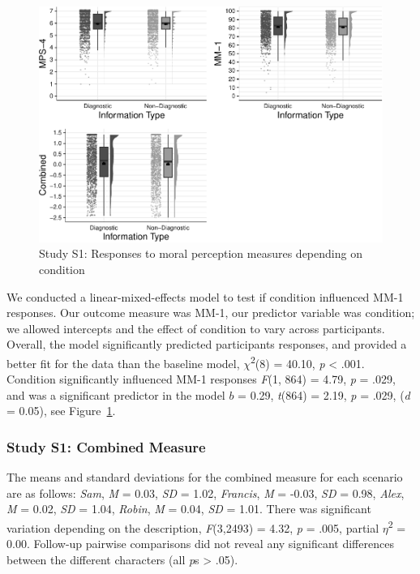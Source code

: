 \documentclass[
  man,floatsintext]{apa6}
\begin{document}
\begin{figure}[!h]
\includegraphics[width=\textwidth,]{Supplementary_files/figure-latex/S4bothconditionplot-1} \caption{Study S1: Responses to moral perception measures depending on condition}\label{fig:S4bothconditionplot}
\end{figure}

We conducted a linear-mixed-effects model to test if condition influenced MM-1 responses. Our outcome measure was MM-1, our predictor variable was condition; we allowed intercepts and the effect of condition to vary across participants. Overall, the model significantly predicted participants responses, and provided a better fit for the data than the baseline model, \(\chi\)\textsuperscript{2}(8) = 40.10, \emph{p} \textless{} .001. Condition significantly influenced MM-1 responses \emph{F}(1, 864) = 4.79, \emph{p} = .029, and was a significant predictor in the model \(b\) = 0.29, \emph{t}(864) = 2.19, \emph{p} = .029, (\emph{d} = 0.05), see Figure~\ref{fig:S4bothconditionplot}.

\subsubsection{Study S1: Combined Measure}\label{study-s1-combined-measure}

The means and standard deviations for the combined measure for each scenario are as follows:
\emph{Sam},
\emph{M} = 0.03, \emph{SD} = 1.02,
\emph{Francis},
\emph{M} = -0.03, \emph{SD} = 0.98,
\emph{Alex},
\emph{M} = 0.02, \emph{SD} = 1.04,
\emph{Robin},
\emph{M} = 0.04, \emph{SD} = 1.01. There was significant variation depending on the description, \emph{F}(3,2493) = 4.32, \emph{p} = .005, partial \(\eta\)\textsuperscript{2} = 0.00. Follow-up pairwise comparisons did not reveal any significant differences between the different characters (all \emph{p}s \textgreater{} .05).
\end{document}
